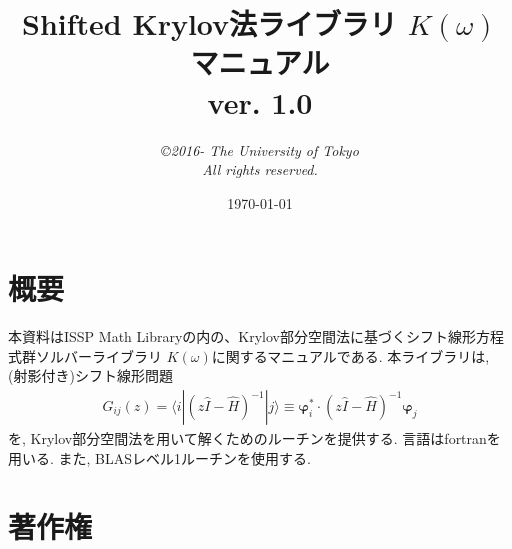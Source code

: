 \documentclass[12pt,titlepage]{jarticle}
\begin{document}
%
%
\title{ Shifted Krylov法ライブラリ $K(\omega)$ マニュアル\\
  ver. 1.0}
\author{{\it \copyright 2016- The University of Tokyo}\\
{\it  All rights reserved.}
}
\date{\today}
\maketitle
%

%
%
\tableofcontents

\section{概要}

本資料はISSP Math Libraryの内の、Krylov部分空間法に基づくシフト線形方程式群ソルバーライブラリ
$K(\omega)$に関するマニュアルである.
本ライブラリは, (射影付き)シフト線形問題
\begin{align}
  G_{i j}(z) = \langle i | (z {\hat I} -{\hat H})^{-1}| j \rangle \equiv 
  {\boldsymbol \varphi}_i^{*} \cdot (z{\hat I}-{\hat H})^{-1} {\boldsymbol \varphi}_j
\end{align}
を, Krylov部分空間法を用いて解くためのルーチンを提供する.
言語はfortranを用いる. 
また, BLASレベル1ルーチンを使用する.

\section{著作権}
\end{document}
